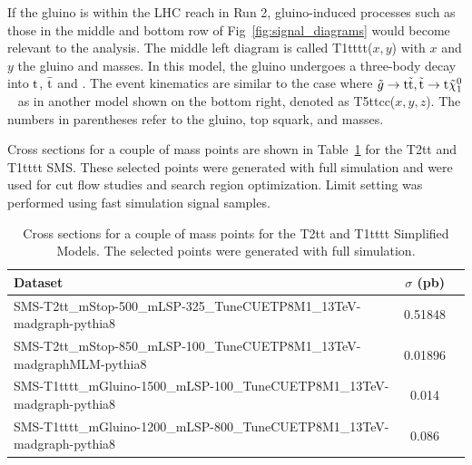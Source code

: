 If the gluino is within the LHC reach in Run 2, gluino-induced processes such as those in the middle and bottom row of Fig~\ref{fig:signal_diagrams} would become relevant to the analysis. The middle left diagram is called T1tttt($x,y$) with $x$ and $y$ the gluino and \chiOneZero masses.
In this model, the gluino undergoes a three-body decay into \ensuremath{\rm t}, \ensuremath{\rm \bar{t}} and 
\chiOneZero. The event kinematics are similar to the case
where
$\tilde{g}\to\mathrm{t}\tilde{{\mathrm t}}, \tilde{{\mathrm t}}\to\mathrm{t}\tilde{\chi}^{0}_{1}$~\cite{CMS-SMS-paper}
as in another model shown on the bottom right, denoted as T5ttcc($x,y,z$). The numbers in parentheses refer to the gluino, top squark, and 
\chiOneZero masses. 

Cross sections for a couple of mass points are shown in Table~\ref{tab:signalMC} for the T2tt and T1tttt SMS. These selected points were generated with full simulation and were used for cut flow studies and search region optimization. Limit setting was performed using fast simulation signal samples.

\begin{table}[hp]
\centering
\caption{Cross sections for a couple of mass points for the T2tt and T1tttt Simplified Models. The selected points were generated with full simulation.} %
\label{tab:signalMC}
{\footnotesize
\begin{tabular}{lcc}
\hline \hline
Dataset & $\sigma$ (pb) \\
\hline
SMS-T2tt\_mStop-500\_mLSP-325\_TuneCUETP8M1\_13TeV-madgraph-pythia8 & 0.51848 \\
SMS-T2tt\_mStop-850\_mLSP-100\_TuneCUETP8M1\_13TeV-madgraphMLM-pythia8 & 0.01896 \\
\hline
SMS-T1tttt\_mGluino-1500\_mLSP-100\_TuneCUETP8M1\_13TeV-madgraph-pythia8 & 0.014 \\
SMS-T1tttt\_mGluino-1200\_mLSP-800\_TuneCUETP8M1\_13TeV-madgraph-pythia8 & 0.086 \\
\hline \hline
\end{tabular}
\footnotesize}
\end{table}

